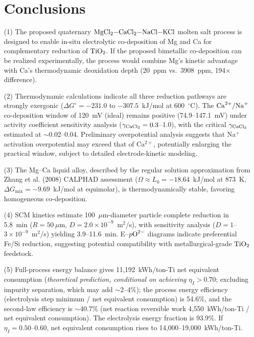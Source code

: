 \documentclass[sn-mathphys,Numbered]{sn-jnl}
\begin{document}
\section{Conclusions}

(1) The proposed quaternary $\ce{MgCl2-CaCl2-NaCl-KCl}$ molten salt process is designed to enable in-situ electrolytic co-deposition of Mg and Ca for complementary reduction of $\ce{TiO2}$. If the proposed bimetallic co-deposition can be realized experimentally, the process would combine Mg's kinetic advantage with Ca's thermodynamic deoxidation depth (20~ppm vs.\ 3908~ppm, 194$\times$ difference).

(2) Thermodynamic calculations indicate all three reduction pathways are strongly exergonic ($\Delta G^{\circ} = -231.0$ to $-307.5$~kJ/mol at 600~$^{\circ}$C). The $\ce{Ca^{2+}/Na+}$ co-deposition window of 120~mV (ideal) remains positive (74.9--147.1~mV) under activity coefficient sensitivity analysis ($\gamma_{\ce{CaCl2}} = 0.3$--1.0), with the critical $\gamma_{\ce{CaCl2}}$ estimated at $\sim$0.02--0.04. Preliminary overpotential analysis suggests that Na$^+$ activation overpotential may exceed that of Ca$^{2+}$, potentially enlarging the practical window, subject to detailed electrode-kinetic modeling.

(3) The Mg--Ca liquid alloy, described by the regular solution approximation from Zhang et al. (2008) CALPHAD assessment ($\Omega \approx L_0 = -18.64$~kJ/mol at 873~K, $\Delta G_{\mathrm{mix}} = -9.69$~kJ/mol at equimolar), is thermodynamically stable, favoring homogeneous co-deposition.

(4) SCM kinetics estimate 100~$\mu$m-diameter particle complete reduction in 5.8~min ($R = 50~\mu$m, $D = 2.0\times10^{-9}$~m$^2$/s), with sensitivity analysis ($D = 1$--$3\times10^{-9}$~m$^2$/s) yielding 3.9--11.6~min. E--$p\ce{O^{2-}}$ diagrams indicate preferential Fe/Si reduction, suggesting potential compatibility with metallurgical-grade $\ce{TiO2}$ feedstock.

(5) Full-process energy balance gives 11{,}192~kWh/ton-Ti net equivalent consumption (\emph{theoretical prediction, conditional on achieving $\eta_I > 0.70$}; excluding impurity separation, which may add $\sim$2--4\%); the process energy efficiency (electrolysis step minimum / net equivalent consumption) is 54.6\%, and the second-law efficiency is $\sim$40.7\% (net reaction reversible work 4{,}550~kWh/ton-Ti / net equivalent consumption). The electrolysis energy fraction is 93.9\%. If $\eta_I = 0.50$--0.60, net equivalent consumption rises to 14{,}000--19{,}000~kWh/ton-Ti.
\end{document}
